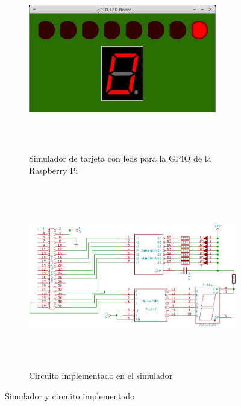 \begin{figure}[H]
	\centering%
	\begin{subfigure}{0.49\textwidth}
		\centering%
		\includegraphics[width=0.9\textwidth,height=8cm,keepaspectratio]{img/simboard.jpg} %
		\caption{Simulador de tarjeta con leds para la GPIO de la Raspberry Pi}
		\label{fig:simboard} %
	\end{subfigure}
	\hfill
	\begin{subfigure}{0.49\textwidth}
		\centering%
		\includegraphics[width=0.9\columnwidth,height=8cm,keepaspectratio]{img/diagram.pdf} %
		\caption{Circuito implementado en el simulador}
		\label{fig:wiring-diagram} %
	\end{subfigure}
	\caption{Simulador y circuito implementado}
	\label{fig:sim} %
\end{figure}


